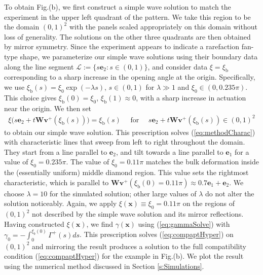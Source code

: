 \documentclass[aps,11pt,tightenlines,notitlepage,superscriptaddress,longbibliography,nofootinbib]{revtex4-1}
\begin{document}
To obtain Fig.(b), we first construct a simple wave solution to match the experiment in the upper left quadrant of the pattern.  We take this region to be the domain $(0,1)^2$ with the panels scaled appropriately on this domain without loss of generality.  The solutions on the other three quadrants are then obtained by mirror symmetry. Since the experiment appears to indicate a rarefaction fan-type shape, we parameterize our simple wave solutions using their boundary data along the line segment $\mathcal{L} := \{ s \mathbf{e}_2 \colon s \in (0,1)\}$, and consider data $\xi=\xi_{\text{b}}$ corresponding to a sharp increase in the opening angle at the origin.  Specifically, we use  $\xi_{\text{b}}(s) = \xi_0 \exp(-\lambda s)$, $s \in (0,1)$ for $\lambda \gg 1$ and $\xi_0 \in (0, 0.235 \pi)$. This choice gives  $\xi_{\text{b}}(0) = \xi_0$, $\xi_{\text{b}}(1)  \approx 0$, with a sharp increase in actuation near the origin.  We then set 
\begin{equation}
\begin{aligned}
\xi\big( s \mathbf{e}_2 + t \mathbf{W} \mathbf{v}^{+}( \xi_{\text{b}}(s)) \big) = \xi_{\text{b}}(s) \quad \text{ for } \quad   s \mathbf{e}_2 + t \mathbf{W} \mathbf{v}^{+}( \xi_{\text{b}}(s)) \in (0,1)^2
\end{aligned}
\end{equation}
to obtain our simple wave solution. This prescription solves (\ref{eq:methodCharac}) with characteristic lines that sweep from left to right throughout the domain. They start from a line parallel to $\mathbf{e}_2$, and tilt towards a line parallel to $\mathbf{e}_1$ for a value of $\xi_0 = 0.235\pi$.  The value of $\xi_0 = 0.11 \pi$ matches the bulk deformation inside the (essentially uniform) middle diamond region.  This value sets the rightmost characteristic, which is parallel to $\mathbf{W} \mathbf{v}^{+}( \xi_{\text{b}}(0) = 0.11\pi)  \approx 0.7 \mathbf{e}_1 + \mathbf{e}_2$. We  choose $\lambda = 10$  for the simulated solution; other large values of $\lambda$ do not alter the solution noticeably.  Again, we apply $\xi(\mathbf{x}) \equiv \xi_0 = 0.11\pi$ on the regions of $(0,1)^2$ not described by the simple wave solution and its mirror reflections. %
Having constructed $\xi(\mathbf{x})$, we find $\gamma(\mathbf{x})$ using (\ref{eq:gammaSolve}) with $\gamma_0 = -\int_0^{\xi_b(0)} \Gamma^{+}(s) ds$. This prescription solves (\ref{eq:compaptHyper}) on $(0,1)^2$  and mirroring the result  produces a solution to the full compatibility condition (\ref{eq:compaptHyper}) for the example in Fig.(b). We plot the result using the numerical method discussed in Section \ref{s:Simulations}.
\end{document}
